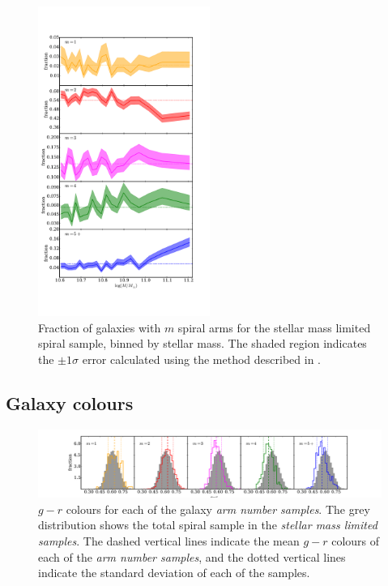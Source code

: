 \documentclass[useAMS,usenatbib]{mn2e}
\begin{document}
\begin{figure}
		\centering
		
        \includegraphics[width=0.5\textwidth]{Results_imgs/mass_plot.pdf}
		
        \caption{Fraction of galaxies with $m$ spiral arms for the stellar mass limited spiral sample, binned by stellar mass. The shaded region indicates the $\pm 1 \sigma$ error calculated using the method described in \protect\cite{Cameron_11}.}
		
        \label{fig:mass_plot}
        
\end{figure}


\subsection{Galaxy colours}

\begin{figure}
		\centering
		
        \includegraphics[width=1\textwidth]{Results_imgs/colour_histogram.pdf}
		
        \caption{$g-r$ colours for each of the galaxy \textit{arm number samples}. The grey distribution shows the total spiral sample in the \textit{stellar mass limited samples}. The dashed vertical lines indicate the mean $g-r$ colours of each of the \textit{arm number samples}, and the dotted vertical lines indicate the standard deviation of each of the samples.}
		
        \label{fig:colour_histogram}
        
\end{figure}
\end{document}
